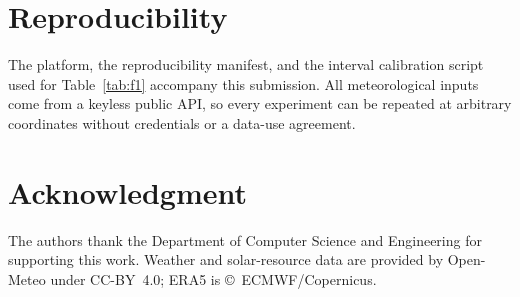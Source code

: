 \documentclass[conference]{IEEEtran}
\begin{document}
\section*{Reproducibility}

The platform, the reproducibility manifest, and the interval
calibration script used for Table~\ref{tab:f1} accompany this
submission. All meteorological inputs come from a keyless public API,
so every experiment can be repeated at arbitrary coordinates without
credentials or a data-use agreement.

\section*{Acknowledgment}

The authors thank the Department of Computer Science and Engineering
for supporting this work. Weather and solar-resource data are provided
by Open-Meteo under CC-BY~4.0; ERA5 is \copyright~ECMWF/Copernicus.
\end{document}
